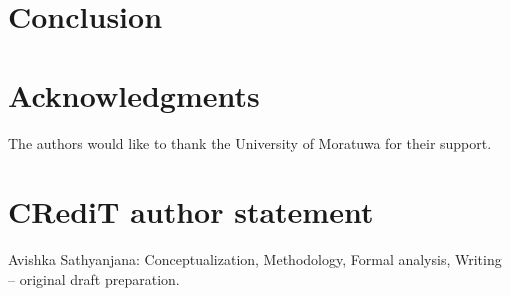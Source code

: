 \documentclass[10pt,a4paper]{article}
\begin{document}
\section{Conclusion}


\section*{Acknowledgments}
The authors would like to thank the University of Moratuwa for their support.

\section*{CRediT author statement}
Avishka Sathyanjana: Conceptualization, Methodology, Formal analysis, Writing – original draft preparation.

\newpage

\end{document}
